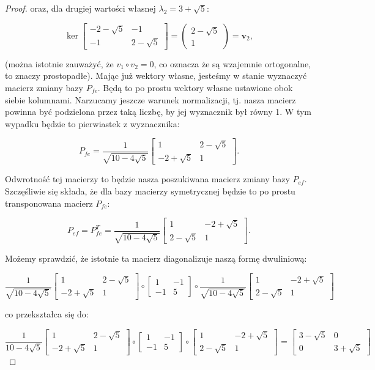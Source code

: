 \documentclass[11pt]{article}
\theoremstyle{definition}
\begin{document}
\begin{proof}
oraz, dla drugiej wartości własnej $\lambda_2 = 3+\sqrt5$:

$$\ker\begin{bmatrix}-2-\sqrt5 & -1\\-1&2-\sqrt5\end{bmatrix} = \begin{pmatrix}2-\sqrt{5}\\1\end{pmatrix} = \mathbf v_2,$$

(można istotnie zauważyć, że $v_1\circ v_2 = 0$, co oznacza że są wzajemnie ortogonalne, to znaczy prostopadłe). Mając już wektory własne, jesteśmy w stanie wyznaczyć macierz zmiany bazy $P_{fe}$. Będą to po prostu wektory własne ustawione obok siebie kolumnami. Narzucamy jeszcze warunek normalizacji, tj. nasza macierz powinna być podzielona przez taką liczbę, by jej wyznacznik był równy 1. W tym wypadku będzie to pierwiastek z wyznacznika:

$$P_{fe} = \frac1{\sqrt{10-4\sqrt{5}}}\begin{bmatrix}1&2-\sqrt5\\-2+\sqrt5&1\end{bmatrix}.$$

Odwrotność tej macierzy to będzie nasza poszukiwana macierz zmiany bazy $P_{ef}$. Szczęśliwie się składa, że dla bazy macierzy symetrycznej będzie to po prostu transponowana macierz $P_{fe}:$

$$P_{ef} = P^T_{fe} = \frac1{\sqrt{10-4\sqrt{5}}}\begin{bmatrix}1&-2+\sqrt5\\2-\sqrt5&1\end{bmatrix}.$$

Możemy sprawdzić, że istotnie ta macierz diagonalizuje naszą formę dwuliniową:

$$\frac1{\sqrt{10-4\sqrt{5}}}\begin{bmatrix}1&2-\sqrt5\\-2+\sqrt5&1\end{bmatrix}\circ\begin{bmatrix}
    1&-1\\
    -1&5
\end{bmatrix}\circ\frac1{\sqrt{10-4\sqrt{5}}}\begin{bmatrix}1&-2+\sqrt5\\2-\sqrt5&1\end{bmatrix}$$

co przekształca się do:


$$\frac1{10-4\sqrt{5}}\begin{bmatrix}1&2-\sqrt5\\-2+\sqrt5&1\end{bmatrix}\circ\begin{bmatrix}
    1&-1\\
    -1&5
\end{bmatrix}\circ\begin{bmatrix}1&-2+\sqrt5\\2-\sqrt5&1\end{bmatrix} = \begin{bmatrix}3 - \sqrt5& 0\\ 0& 3 + \sqrt5\end{bmatrix}$$


\end{proof}
\end{document}
